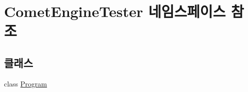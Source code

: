 \hypertarget{namespace_comet_engine_tester}{}\section{Comet\+Engine\+Tester 네임스페이스 참조}
\label{namespace_comet_engine_tester}
\subsection*{클래스}
\begin{DoxyCompactItemize}
\item 
class \hyperlink{class_comet_engine_tester_1_1_program}{Program}
\end{DoxyCompactItemize}

